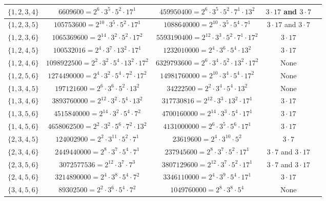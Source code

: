 \documentclass[12pt]{article}%
\begin{document}
\begin{footnotesize}
\begin{center}
\begin{tabular}{ |c  | c | c | c  | c|} \hline
$\{1,2,3,4 \}$ & $6609600 = 2^6\cdot 3^5\cdot 5^2\cdot 17^1$ & 
$459950400 =2^6\cdot 3^5\cdot 5^2\cdot 7^1\cdot 13^2$ & $3 \cdot 17$ and $3 \cdot 7$ \\ \hline
$\{1,2,3,5 \}$ & $105753600 = 2^{10}\cdot 3^5\cdot 5^2\cdot 17^1$ & 
$1088640000 = 2^{10}\cdot 3^5\cdot 5^4\cdot 7^1 $ & $3 \cdot 17$ and $3 \cdot 7$ \\ \hline
$\{1,2,3,6 \}$ & $1065369600 = 2^{14}\cdot 3^2\cdot 5^2\cdot 17^2$ & 
$5593190400 = 2^{12}\cdot 3^3\cdot 5^2\cdot 7^1\cdot 17^2$ & $3 \cdot 17$  \\ \hline
$\{1,2,4,5 \}$ & $100532016 = 2^4\cdot 3^7\cdot 13^2\cdot 17^1$ & 
$1232010000 = 2^4\cdot 3^6\cdot 5^4\cdot 13^2$ & $3 \cdot 17$  \\ \hline
$\{1,2,4,6 \}$ & $1098922500 = 2^2\cdot 3^2\cdot 5^4\cdot 13^2\cdot 17^2$ & 
$6329793600 = 2^6\cdot 3^4\cdot 5^2\cdot 13^2\cdot 17^2$ & None  \\ \hline
$\{1,2,5,6 \}$ & $1274490000 = 2^4\cdot 3^2\cdot 5^4\cdot 7^2\cdot 17^2$ & 
$14981760000 = 2^{10}\cdot 3^4\cdot 5^4\cdot 17^2$ & None  \\ \hline
$\{1,3,4,5 \}$ & $197121600 = 2^6\cdot 3^6\cdot 5^2\cdot 13^2$ & 
$34222500 = 2^2\cdot 3^4\cdot 5^4\cdot 13^2$ & None  \\ \hline
$\{1,3,4,6 \}$ & $3893760000 = 2^{12}\cdot 3^2\cdot 5^4\cdot 13^2$ & 
$317730816 = 2^{12}\cdot 3^3\cdot 13^2\cdot 17^1$ & $3 \cdot 17$  \\ \hline
$\{1,3,5,6 \}$ & $4515840000 = 2^{14}\cdot 3^2\cdot 5^4\cdot 7^2$ & 
$4700160000 = 2^{14}\cdot 3^3\cdot 5^4\cdot 17^1$ & $3 \cdot 17$  \\ \hline
$\{1,4,5,6 \}$ & $4658062500 = 2^2\cdot 3^2\cdot 5^6\cdot 7^2\cdot 13^2$ & 
$4131000000 = 2^6\cdot 3^5\cdot 5^6\cdot 17^1$ & $3 \cdot 17$  \\ \hline
$\{2,3,4,5 \}$ & $124002900 = 2^2\cdot 3^{11}\cdot 5^2\cdot 7^1$ & 
$23619600 = 2^4\cdot 3^{10}\cdot 5^2$ & $3 \cdot 7$  \\ \hline
$\{2,3,4,6 \}$ & $2449440000 = 2^8\cdot 3^7\cdot 5^4\cdot 7^1$ & 
$237945600 = 2^8\cdot 3^7\cdot 5^2\cdot 17^1$ & $3 \cdot 7$ and $3 \cdot 17$  \\ \hline
$\{2,3,5,6 \}$ & $3072577536 = 2^{12}\cdot 3^7\cdot 7^3$ & 
$3807129600 =2^{12}\cdot 3^7\cdot 5^2\cdot 17^1$ & $3 \cdot 7$ and $3 \cdot 17$  \\ \hline
$\{2,4,5,6 \}$ & $3214890000 = 2^4\cdot 3^8\cdot 5^4\cdot 7^2$ & 
$3346110000 = 2^4\cdot 3^9\cdot 5^4\cdot 17^1$ & $3 \cdot 17$  \\ \hline
$\{3,4,5,6 \}$ & $89302500 =2^2\cdot 3^6\cdot 5^4\cdot 7^2$ & 
$1049760000 = 2^8\cdot 3^8\cdot 5^4$ & None  \\ \hline
\end{tabular}
\end{center}
\end{footnotesize}
\end{document}
